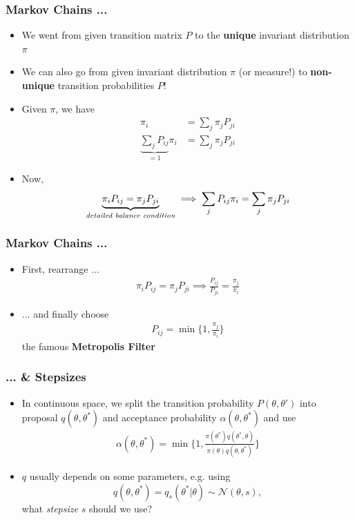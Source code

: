\begin{frame}[c]
    \frametitle{Markov Chains ...}
    \begin{itemize}
        \item We went from given transition matrix $P$ to the \textbf{unique} invariant distribution $\pi$
        \item We can also go from given invariant distribution $\pi$ (or measure!) to \textbf{non-unique} transition probabilities $P$!
        \item Given $\pi$, we have 
            \begin{align*}
                \pi_i &= \sum_j \pi_j P_{ji} \\
                \underbrace{\sum_j P_{ij}}_{=1} \pi_i &= \sum_j \pi_j P_{ji} 
            \end{align*}
        \item Now, 
            \begin{align*}
            \underbrace{\pi_i P_{ij} = \pi_j P_{ji}}_{\text{\emph{detailed balance condition}}} \implies \sum_j P_{ij} \pi_i = \sum_j \pi_j P_{ji} 
            \end{align*}
    \end{itemize}
\end{frame}

\begin{frame}[c]
    \frametitle{Markov Chains ...}
    \begin{itemize}
        \item First, rearrange ...
            \begin{align*}
                \pi_i P_{ij} = \pi_j P_{ji} \implies
                \frac{P_{ij}}{P_{ji}} = \frac{\pi_j}{\pi_i}
            \end{align*}
        \item ... and finally choose
            \begin{align*}
                P_{ij} = \min\Big\{1, \frac{\pi_j}{\pi_i}\Big\}
            \end{align*}
            the famous \textbf{Metropolis Filter}
    \end{itemize}
\end{frame}

\begin{frame}[c]
    \frametitle{... \& Stepsizes}
    \begin{itemize}
        \item In continuous space, we split the transition probability $P(\theta, \theta')$ 
            into proposal $q(\theta, \theta^*)$ and acceptance probability $\alpha(\theta, \theta^*)$ and use
            \begin{align*}
                \alpha(\theta, \theta^*) = \min\Big\{1, \frac{\pi(\theta^*)q(\theta^*, \theta)}{\pi(\theta)q(\theta, \theta^*)}\Big\}
            \end{align*}
        \item $q$ usually depends on some parameters, e.g. using 
            \[
                q(\theta, \theta^*) = q_{s}(\theta^* | \theta) \sim \mathcal{N}(\theta, s),
            \]
            what \emph{stepsize} $s$ should we use?
    \end{itemize}
\end{frame}

